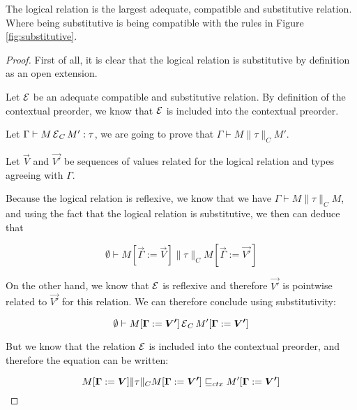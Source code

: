 \begin{alemma}
    The logical relation is the largest adequate, compatible 
    and substitutive relation. Where being substitutive is 
    being compatible with the rules in Figure \ref{fig:substitutive}.
\end{alemma}

\begin{ensps}
\begin{proof}
    First of all, it is clear that the logical relation is substitutive 
    by definition as an open extension.

    Let $\operatorname{\mathcal{E}}$ be an adequate compatible and substitutive relation.
    By definition of the contextual preorder, we know that $\operatorname{\mathcal{E}}$
    is included into the contextual preorder. 

    Let $\Gamma \vdash M \operatorname{\mathcal{E}}_C M' : \tau$, we are going 
    to prove that $\Gamma \vdash M \| \tau \|_C M'$. 
    
    Let $\vec{V}$ and $\vec{V'}$ be
    sequences of values related for the logical relation and
    types agreeing with $\Gamma$. 

    Because the logical relation is reflexive, we know that 
    we have $\Gamma \vdash M \| \tau \|_C M$, and using the
    fact that the logical relation is substitutive, we then 
    can deduce that

    \begin{equation*}
        \emptyset \vdash M[\vec{\Gamma} := \vec{V}] \| \tau \|_C 
                         M[\vec{\Gamma} := \vec{V'}]
    \end{equation*}
    
    On the other hand, we know that $\operatorname{\mathcal{E}}$ is reflexive 
    and therefore $\vec{V'}$ is pointwise related 
    to $\vec{V'}$ for this relation. We can therefore 
    conclude using substitutivity:

    \begin{equation*}
        \emptyset \vdash M[\vec{\Gamma} := \vec{V'}] 
        \CE_C
                         M'[\vec{\Gamma} := \vec{V'}]
    \end{equation*}

    But we know that the relation $\operatorname{\mathcal{E}}$ is included into 
    the contextual preorder, and therefore the 
    equation can be written:

    \begin{equation*}
        M[\vec{\Gamma} := \vec{V}] 
        \| \tau \|_C
        M[\vec{\Gamma} := \vec{V'}]
        \sqeq_{ctx}
        M'[\vec{\Gamma} := \vec{V'}]
    \end{equation*}


\end{proof}
\end{ensps}
